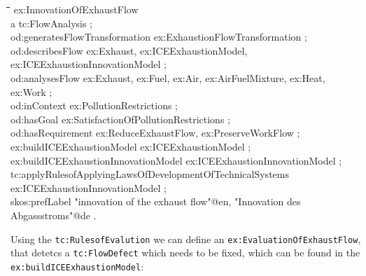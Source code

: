 \documentclass[a4paper,11pt]{article}
\newenvironment{code}{\tt \begin{tabbing}
\hskip12pt\=\hskip12pt\=\hskip12pt\=\hskip12pt\=\hskip5cm\=\hskip5cm\=\kill}
{\end{tabbing}}
\begin{document}
\begin{itemize}
    \begin{code}
    ex:InnovationOfExhaustFlow \\
    \> a tc:FlowAnalysis ; \\
    \> od:generatesFlowTransformation ex:ExhaustionFlowTransformation ; \\
    \> od:describesFlow ex:Exhaust, ex:ICEExhaustionModel,  \\
    \> ex:ICEExhaustionInnovationModel ; \\
    \> od:analysesFlow ex:Exhaust, ex:Fuel, ex:Air, ex:AirFuelMixture, ex:Heat, \\
    \> ex:Work ; \\
    \> od:inContext ex:PollutionRestrictions ; \\
    \> od:hasGoal ex:SatisfactionOfPollutionRestrictions ; \\
    \> od:hasRequirement ex:ReduceExhaustFlow, ex:PreserveWorkFlow ; \\
    \> ex:buildICEExhaustionModel ex:ICEExhaustionModel ; \\
    \> ex:buildICEExhaustionInnovationModel ex:ICEExhaustionInnovationModel ; \\
    \> tc:applyRulesofApplyingLawsOfDevelopmentOfTechnicalSystems  \\
    \> ex:ICEExhaustionInnovationModel ; \\
    \> skos:prefLabel "innovation of the exhaust flow"@en, "Innovation des  \\
    \> Abgassstroms"@de . \\
    \end{code}

    Using the \texttt{tc:RulesofEvalution} we can define an 
    \texttt{ex:EvaluationOfExhaustFlow}, that detetcs a 
    \texttt{tc:FlowDefect} which needs to be fixed, which can be found in the 
    \newline
    \texttt{ex:buildICEExhaustionModel}:


\end{itemize}
\end{document}
